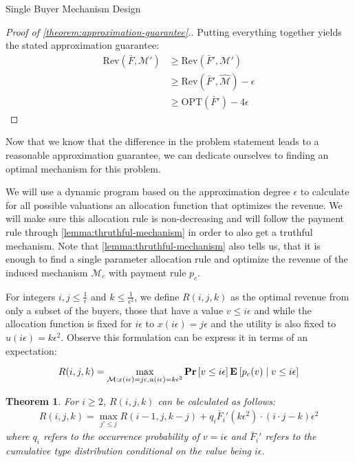 \documentclass[11pt,a4paper]{article}
\newtheorem{theorem}{Theorem}
\renewcommand{\Pr}[1]{\mbox{\rm\bf Pr}\left[#1\right]}
\newcommand{\Ex}[2][]{\mbox{\rm\bf E}_{#1}\left[#2\right]}
\newcommand{\1}[1]{\mbox{\rm\bf 1}_{#1}}
\begin{document}
\begin{section}{Single Buyer Mechanism Design}
\begin{proof}[Proof of \autoref{theorem:approximation-guarantee}.]
     Putting everything together yields the stated approximation guarantee:
     \begin{align*}
         \mathrm{Rev}(\bar{F}, \mathcal{M}') & \geq \mathrm{Rev}(\bar{F}', \mathcal{M}')                     \\
                                             & \geq \mathrm{Rev}(\bar{F}', \widehat{\mathcal{M}}) - \epsilon \\
                                             & \geq \mathrm{OPT}(\bar{F}') - 4\epsilon
     \end{align*}
 \end{proof}

 Now that we know that the difference in the problem statement leads to a reasonable approximation guarantee,
 we can dedicate ourselves to finding an optimal mechanism for this problem.

 We will use a dynamic program based on the approximation degree $\epsilon$ to calculate for all possible valuations
 an allocation function that optimizes the revenue.
 We will make sure this allocation rule is non-decreasing and will follow the payment rule through \autoref{lemma:thruthful-mechanism}
 in order to also get a truthful mechanism.
 Note that \autoref{lemma:thruthful-mechanism} also tells us, that it is enough to find a single parameter allocation rule and optimize the revenue of the induced mechanism $\mathcal{M}_c$ with payment rule $p_c$.

 For integers $i,j \leq \frac{1}{\epsilon}$ and $k \leq \frac{1}{\epsilon^2}$,
 we define $R(i,j,k)$ as the optimal revenue from only a subset of the buyers, those that have a value $v \leq i \epsilon$
 and while the allocation function is fixed for $i\epsilon$ to $x(i \epsilon) = j \epsilon$ and the utility is also fixed to $u(i \epsilon) = k \epsilon^2$.
 Observe this formulation can be express it in terms of an expectation:

 \begin{equation}
     \label{eq:rijk}
     R(i,j,k) = \max_{\mathcal{M}: x(i\epsilon) = j\epsilon, u(i\epsilon) = k \epsilon^2} \Pr{v \leq i\epsilon}\Ex{p_c(v)\mid v \leq i \epsilon}
 \end{equation}

 \begin{theorem}
     \label{theorem:recursion-formular}
     For $i \geq 2$, $R(i,j,k)$ can be calculated as follows:
     \begin{align*}
         R(i,j,k) = \max_{j' \leq j} R(i-1, j, k - j) + q_i \bar{F}_i'(k \epsilon^2) \cdot (i\cdot j - k)\epsilon^2
     \end{align*}
     where $q_i$ refers to the occurrence probability of $v = i \epsilon$ and $\bar{F}_i'$ refers to the cumulative type distribution conditional on the value being $i\epsilon$.
 \end{theorem}


\end{section}
\end{document}
